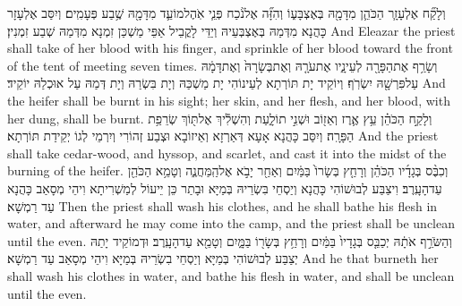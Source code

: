 {וְלָקַ֞ח אֶלְעָזָ֧ר הַכֹּהֵ֛ן מִדָּמָ֖הּ בְּאֶצְבָּע֑וֹ וְהִזָּ֞ה אֶל\maqqaf נֹ֨כַח פְּנֵ֧י אֹֽהֶל\maqqaf מוֹעֵ֛ד מִדָּמָ֖הּ שֶׁ֥בַע פְּעָמִֽים׃}
{וְיִסַּב אֶלְעָזָר כָּהֲנָא מִדְּמַהּ בְּאֶצְבְּעֵיהּ וְיַדֵּי לָקֳבֵיל אַפֵּי מַשְׁכַּן זִמְנָא מִדְּמַהּ שְׁבַע זִמְנִין׃}
{And Eleazar the priest shall take of her blood with his finger, and sprinkle of her blood toward the front of the tent of meeting seven times.}{}
{וְשָׂרַ֥ף אֶת\maqqaf הַפָּרָ֖ה לְעֵינָ֑יו אֶת\maqqaf עֹרָ֤הּ וְאֶת\maqqaf בְּשָׂרָהּ֙ וְאֶת\maqqaf דָּמָ֔הּ עַל\maqqaf פִּרְשָׁ֖הּ יִשְׂרֹֽף׃}
{וְיוֹקֵיד יָת תּוֹרְתָא לְעֵינוֹהִי יָת מַשְׁכַּהּ וְיָת בִּשְׂרַהּ וְיָת דְּמַהּ עַל אוּכְלַהּ יוֹקֵיד׃}
{And the heifer shall be burnt in his sight; her skin, and her flesh, and her blood, with her dung, shall be burnt.}{}
{וְלָקַ֣ח הַכֹּהֵ֗ן עֵ֥ץ אֶ֛רֶז וְאֵז֖וֹב וּשְׁנִ֣י תוֹלָ֑עַת וְהִשְׁלִ֕יךְ אֶל\maqqaf תּ֖וֹךְ שְׂרֵפַ֥ת הַפָּרָֽה׃}
{וְיִסַּב כָּהֲנָא אָעָא דְּאַרְזָא וְאֵיזוֹבָא וּצְבַע זְהוֹרִי וְיִרְמֵי לְגוֹ יְקֵידַת תּוֹרְתָא׃}
{And the priest shall take cedar-wood, and hyssop, and scarlet, and cast it into the midst of the burning of the heifer.}{}
{וְכִבֶּ֨ס בְּגָדָ֜יו הַכֹּהֵ֗ן וְרָחַ֤ץ בְּשָׂרוֹ֙ בַּמַּ֔יִם וְאַחַ֖ר יָבֹ֣א אֶל\maqqaf הַֽמַּחֲנֶ֑ה וְטָמֵ֥א הַכֹּהֵ֖ן עַד\maqqaf הָעָֽרֶב׃}
{וִיצַבַּע לְבוּשׁוֹהִי כָּהֲנָא וְיַסְחֵי בִּשְׂרֵיהּ בְּמַיָּא וּבָתַר כֵּן יֵיעוֹל לְמַשְׁרִיתָא וִיהֵי מְסָאַב כָּהֲנָא עַד רַמְשָׁא׃}
{Then the priest shall wash his clothes, and he shall bathe his flesh in water, and afterward he may come into the camp, and the priest shall be unclean until the even.}{}
{וְהַשֹּׂרֵ֣ף אֹתָ֔הּ יְכַבֵּ֤ס בְּגָדָיו֙ בַּמַּ֔יִם וְרָחַ֥ץ בְּשָׂר֖וֹ בַּמָּ֑יִם וְטָמֵ֖א עַד\maqqaf הָעָֽרֶב׃}
{וּדְמוֹקֵיד יָתַהּ יְצַבַּע לְבוּשׁוֹהִי בְּמַיָּא וְיַסְחֵי בִשְׂרֵיהּ בְּמַיָּא וִיהֵי מְסָאַב עַד רַמְשָׁא׃}
{And he that burneth her shall wash his clothes in water, and bathe his flesh in water, and shall be unclean until the even.}{}
